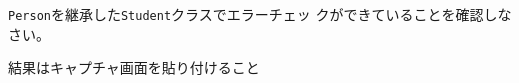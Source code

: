  \begin{Prob}\upshape
  \texttt{Person}を継承した\texttt{Student}クラスでエラーチェッ
  クができていることを確認しなさい。
\end{Prob}
\ifText 結果はキャプチャ画面を貼り付けること\vspace{0.3\textheight}\fi